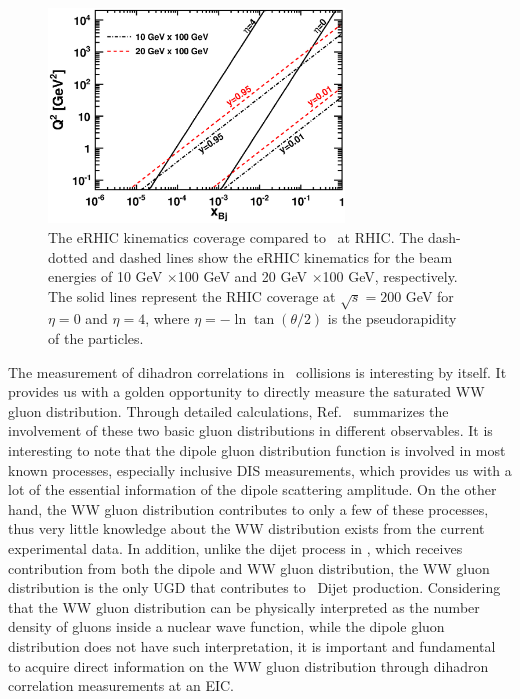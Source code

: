 \begin{figure}[hbt] 
\begin{center}
\includegraphics[width=0.7\textwidth]{plots/chpt6/eAvsdA_kinematics.eps} 
\end{center} 
\caption[kinematics coverage of eRHIC vs RHIC]
{The eRHIC kinematics coverage compared to \pA\ at RHIC. The dash-dotted and dashed
lines show the eRHIC kinematics for the beam energies of 10 GeV
$\times$100 GeV and 20 GeV $\times$100 GeV, respectively. The solid lines 
represent the RHIC coverage at $\sqrt{s}=200$ GeV for $\eta=0$ and $\eta=4$, where
$\eta=-\ln\tan(\theta/2)$ is the pseudorapidity of the particles.
\label{fig:eAvspA_kinematics}}
\end{figure}

The measurement of dihadron correlations in \eA\ collisions is
interesting by itself. It provides us with a golden opportunity to directly
measure the saturated WW gluon distribution. Through detailed calculations,
Ref.~\cite{Dominguez:2011wm} summarizes the involvement of these two basic
gluon distributions in different observables. It is interesting
to note that the dipole gluon distribution function is involved in most
known processes, especially inclusive DIS measurements, which provides us with a
lot of the essential information of the dipole scattering amplitude. On the
other hand, the WW gluon distribution contributes to only a few of these
processes, thus very little knowledge about the WW distribution exists from
the current experimental data. In addition, unlike the dijet process in \pA,
which receives contribution from both the dipole and WW gluon distribution, the WW gluon
distribution is the only UGD that contributes to \eA\ Dijet production. Considering
that the WW gluon distribution can be physically interpreted as the number density
of gluons inside a nuclear wave function, while the dipole gluon distribution
does not have such interpretation, it is important and fundamental to
acquire direct information on the WW gluon distribution through dihadron
correlation measurements at an EIC.



